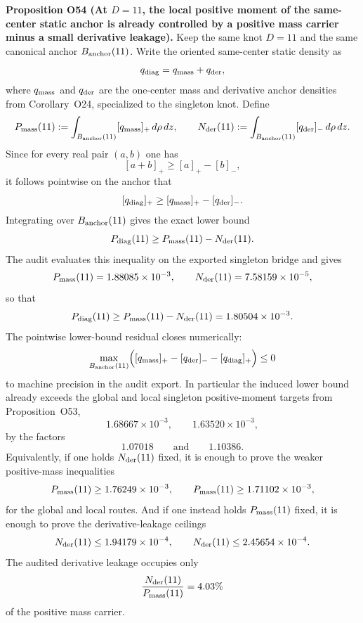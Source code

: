 \documentclass[aps,prd,onecolumn,notitlepage,nofootinbib,superscriptaddress,11pt,floatfix]{revtex4-2}
\begin{document}
\medskip\noindent\textbf{Proposition O54 (At \(D=11\), the local positive moment of the same-center static anchor is already controlled by a positive mass carrier minus a small derivative leakage).}
Keep the same knot \(D=11\) and the same canonical anchor \(B_{\rm anchor}(11)\).  Write the oriented same-center static density as
\[
q_{\rm diag}=q_{\rm mass}+q_{\rm der},
\]
where \(q_{\rm mass}\) and \(q_{\rm der}\) are the one-center mass and derivative anchor densities from Corollary~O24, specialized to the singleton knot.  Define
\[
P_{\rm mass}(11):=\int_{B_{\rm anchor}(11)} [q_{\rm mass}]_+\,d\rho\,dz,
\qquad
N_{\rm der}(11):=\int_{B_{\rm anchor}(11)} [q_{\rm der}]_-\,d\rho\,dz.
\]
Since for every real pair \((a,b)\) one has
\[
[a+b]_+ \ge [a]_+ - [b]_-,
\]
it follows pointwise on the anchor that
\[
[q_{\rm diag}]_+ \ge [q_{\rm mass}]_+ - [q_{\rm der}]_-.
\]
Integrating over \(B_{\rm anchor}(11)\) gives the exact lower bound
\[
P_{\rm diag}(11)\ge P_{\rm mass}(11)-N_{\rm der}(11).
\]
The audit
evaluates this inequality on the exported singleton bridge and gives
\[
P_{\rm mass}(11)=1.88085\times10^{-3},
\qquad
N_{\rm der}(11)=7.58159\times10^{-5},
\]
so that
\[
P_{\rm diag}(11)\ge P_{\rm mass}(11)-N_{\rm der}(11)
=
1.80504\times10^{-3}.
\]
The pointwise lower-bound residual closes numerically:
\[
\max_{B_{\rm anchor}(11)}
\Bigl([q_{\rm mass}]_+ - [q_{\rm der}]_- - [q_{\rm diag}]_+\Bigr)
\le 0
\]
to machine precision in the audit export.  In particular the induced lower bound already exceeds the global and local singleton positive-moment targets from Proposition~O53,
\[
1.68667\times10^{-3},
\qquad
1.63520\times10^{-3},
\]
by the factors
\[
1.07018
\qquad\text{and}\qquad
1.10386.
\]
Equivalently, if one holds \(N_{\rm der}(11)\) fixed, it is enough to prove the weaker positive-mass inequalities
\[
P_{\rm mass}(11)\ge 1.76249\times10^{-3},
\qquad
P_{\rm mass}(11)\ge 1.71102\times10^{-3},
\]
for the global and local routes.  And if one instead holds \(P_{\rm mass}(11)\) fixed, it is enough to prove the derivative-leakage ceilings
\[
N_{\rm der}(11)\le 1.94179\times10^{-4},
\qquad
N_{\rm der}(11)\le 2.45654\times10^{-4}.
\]
The audited derivative leakage occupies only
\[
\frac{N_{\rm der}(11)}{P_{\rm mass}(11)}=4.03\%
\]
of the positive mass carrier.
\end{document}
